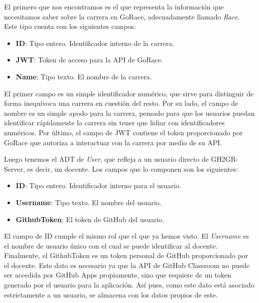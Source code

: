 El primero que nos encontramos es el que representa la información que necesitamos saber sobre la carrera en GoRace, adecuadamente llamado \textit{Race}. Este tipo cuenta con los siguientes campos:
\begin{itemize}
    \item \textbf{ID}: Tipo entero. Identificador interno de la carrera.
    \item \textbf{JWT}: Token de acceso para la API de GoRace.
    \item \textbf{Name}: Tipo texto. El nombre de la carrera.
\end{itemize}

El primer campo es un simple identificador numérico, que sirve para distinguir de forma inequívoca una carrera en cuestión del resto. Por su lado, el campo de nombre es un simple apodo para la carrera, pensado para que los usuarios puedan identificar rápidamente la carrera sin tener que lidiar con identificadores numéricos. Por último, el campo de \acrshort{JWT} contiene el token proporcionado por GoRace que autoriza a interactuar con la carrera por medio de su \acrshort{API}.

Luego tenemos el \acrshort{ADT} de \textit{User}, que refleja a un usuario directo de GH2GR-Server, es decir, un docente. Los campos que lo componen son los siguientes:
\begin{itemize}
    \item \textbf{ID}: Tipo entero. Identificador interno para el usuario.
    \item \textbf{Username}: Tipo texto. El nombre del usuario.
    \item \textbf{GithubToken}: El token de GitHub del usuario.
\end{itemize}
El campo de ID cumple el mismo rol que el que ya hemos visto. El \textit{Username} es el nombre de usuario único con el cual se puede identificar al docente. Finalmente, el GithubToken es un token personal de GitHub proporcionado por el docente. Este dato es necesario ya que la \acrshort{API} de GitHub Classroom no puede ser accedida por GitHub Apps propiamente, sino que requiere de un token generado por el usuario para la aplicación\cite{ClassroomAPI}. Así pues, como este dato está asociado estrictamente a un usuario, se almacena con los datos propios de este.

